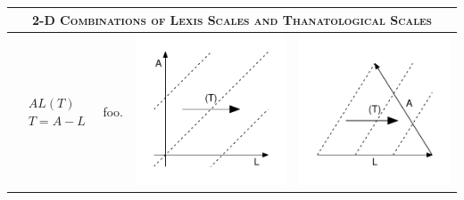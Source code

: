 \documentclass[
  12pt
]{scrartcl}
\begin{document}
\begin{center}
\begin{longtable}{m{}m{}m{}m{}}
  \midrule
  \multicolumn{4}{c}{\textsc{2-D Combinations of Lexis Scales and Thanatological Scales}} \\
  \midrule
  $$\begin{aligned}
    &AL(T) \\
    &T = A - L
  \end{aligned}$$ &
  foo. &
  \includegraphics[width = \linewidth]{../fig/ALt.pdf} &
  \includegraphics[width = \linewidth]{../fig/ALt_iso.pdf}  \\

\end{longtable}
\end{center}
\end{document}
